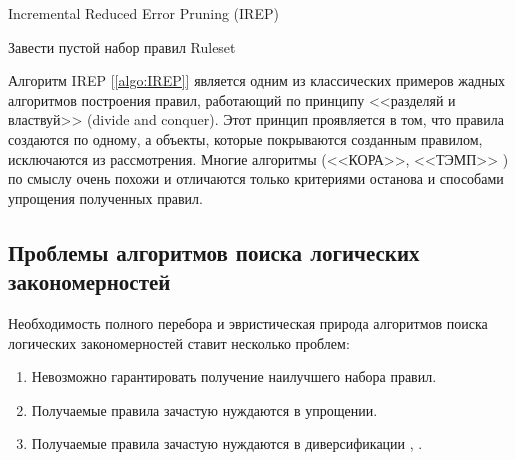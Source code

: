 \documentclass[12pt]{article}
\begin{document}
\begin{algorithm}[!htpb]
  \caption{Incremental Reduced Error Pruning (IREP)}\label{algo:IREP}
   {
    Завести пустой набор правил Ruleset\;
    \;
  }
\end{algorithm}

Алгоритм IREP [\ref{algo:IREP}] является одним из классических примеров
жадных алгоритмов построения правил, работающий по принципу <<разделяй
и властвуй>> (divide and conquer). Этот принцип проявляется в том, что
правила создаются по одному, а объекты, которые покрываются созданным
правилом, исключаются из рассмотрения. Многие алгоритмы (<<КОРА>>,
<<ТЭМП>> \cite{voron10logicalgs}) по смыслу очень похожи и отличаются
только критериями останова и способами упрощения полученных правил.

\subsection{Проблемы алгоритмов поиска логических закономерностей}

Необходимость полного перебора и эвристическая природа алгоритмов
поиска логических закономерностей ставит несколько проблем:

\begin{enumerate}
\item Невозможно гарантировать получение наилучшего набора правил.
\item Получаемые правила зачастую нуждаются в упрощении.
\item Получаемые правила зачастую нуждаются в диверсификации
  \cite{voron10logicalgs}, \cite{vainzvaig75voting}.
\end{enumerate}
\end{document}
